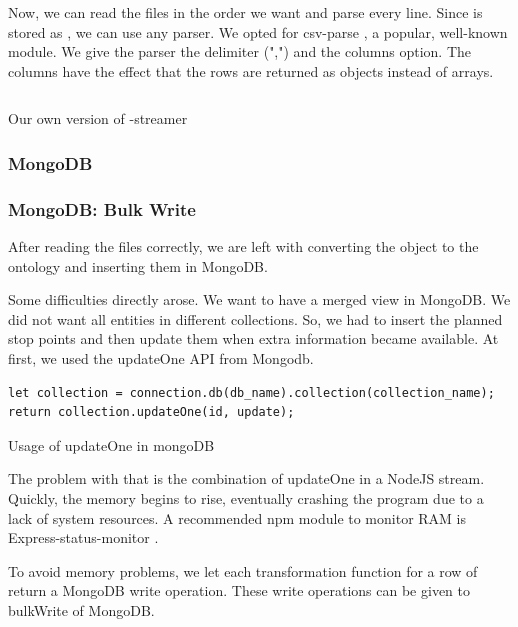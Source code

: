 Now, we can read the files in the order we want and parse every line. Since  is stored as , we can use any  parser. We opted for csv-parse \cite{noauthor_csv-parse_2024}, a popular, well-known module. We give the parser the delimiter (",") and the columns option. The columns have the effect that the rows are returned as  objects instead of arrays.

\begin{listing}[H]
\inputminted[linenos,frame=single,breaklines]{TypeScript}{code/own_gtfs_streamer.js}
    \caption{Our own version of -streamer}
\label{listing:gtfs:streamer}
\end{listing}

\subsubsection{MongoDB}

\subsubsection{MongoDB: Bulk Write}
After reading the  files correctly, we are left with converting the  object to the ontology and inserting them in MongoDB.

Some difficulties directly arose. We want to have a merged view in MongoDB. We did not want all entities in different collections. So, we had to insert the planned stop points and then update them when extra information became available. At first, we used the updateOne API from Mongodb. 
\begin{listing}[H]
    \begin{verbatim}
let collection = connection.db(db_name).collection(collection_name);
return collection.updateOne(id, update);
    \end{verbatim}
    \caption{Usage of updateOne in mongoDB}
\label{listing:mongoDB:updateone}
\end{listing}
The problem with that is the combination of updateOne in a NodeJS stream. Quickly, the memory begins to rise, eventually crashing the program due to a lack of system resources. A recommended npm module to monitor RAM is Express-status-monitor \cite{noauthor_express-status-monitor_2022}.

To avoid memory problems, we let each transformation function for a row of  return a MongoDB write operation. These write operations can be given to bulkWrite of MongoDB. 

